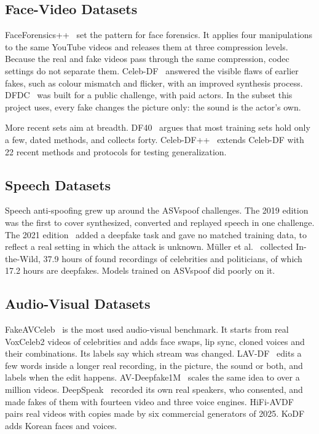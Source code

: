\subsection{Face-Video Datasets}

FaceForensics++~\cite{ffpp} set the pattern for face forensics. It applies
four manipulations to the same YouTube videos and releases them at three
compression levels. Because the real and fake videos pass through the same
compression, codec settings do not separate them. Celeb-DF~\cite{celebdf}
answered the visible flaws of earlier fakes, such as colour mismatch and
flicker, with an improved synthesis process. DFDC~\cite{dfdc} was built for a
public challenge, with paid actors. In the subset this project uses, every
fake changes the picture only: the sound is the actor's own.

More recent sets aim at breadth. DF40~\cite{df40} argues that most training
sets hold only a few, dated methods, and collects forty. Celeb-DF++~\cite{celebdfpp}
extends Celeb-DF with 22 recent methods and protocols for testing
generalization.

\subsection{Speech Datasets}

Speech anti-spoofing grew up around the ASVspoof challenges. The 2019
edition~\cite{asvspoof2019} was the first to cover synthesized, converted and
replayed speech in one challenge. The 2021 edition~\cite{asvspoof2021} added a
deepfake task and gave no matched training data, to reflect a real setting in
which the attack is unknown. M\"uller et al.~\cite{mueller2022} collected
In-the-Wild, 37.9 hours of found recordings of celebrities and politicians, of
which 17.2 hours are deepfakes. Models trained on ASVspoof did poorly on it.

\subsection{Audio-Visual Datasets}

FakeAVCeleb~\cite{fakeavceleb} is the most used audio-visual benchmark. It
starts from real VoxCeleb2 videos of celebrities and adds face swaps, lip
sync, cloned voices and their combinations. Its labels say which stream was
changed. LAV-DF~\cite{lavdf} edits a few words inside a longer real
recording, in the picture, the sound or both, and labels when the edit
happens. AV-Deepfake1M~\cite{avdeepfake1m} scales the same idea to over a
million videos. DeepSpeak~\cite{deepspeak} recorded its own real speakers, who
consented, and made fakes of them with fourteen video and three voice
engines. HiFi-AVDF~\cite{havic} pairs real videos with copies made by six
commercial generators of 2025. KoDF~\cite{kodf} adds Korean faces and voices.

